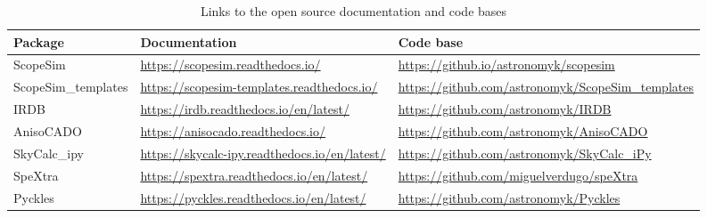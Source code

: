 \begin{table}
\caption{Links to the open source documentation and code bases}
\label{tbl-list-of-packages}
\begin{tabularx}{\linewidth}{|l|X|X|}
\hline

Package
 &
Documentation
 &
Code base
 \\
\hline

ScopeSim
 &
\url{https://scopesim.readthedocs.io/}
 &
\url{https://github.io/astronomyk/scopesim}
 \\
\hline

ScopeSim\_templates
 &
\url{https://scopesim-templates.readthedocs.io/}
 &
\url{https://github.com/astronomyk/ScopeSim_templates}
 \\
\hline

IRDB
 &
\url{https://irdb.readthedocs.io/en/latest/}
 &
\url{https://github.com/astronomyk/IRDB}
 \\
\hline

AnisoCADO
 &
\url{https://anisocado.readthedocs.io/}
 &
\url{https://github.com/astronomyk/AnisoCADO}
 \\
\hline

SkyCalc\_ipy
 &
\url{https://skycalc-ipy.readthedocs.io/en/latest/}
 &
\url{https://github.com/astronomyk/SkyCalc_iPy}
 \\
\hline

SpeXtra
 &
\url{https://spextra.readthedocs.io/en/latest/}
 &
\url{https://github.com/miguelverdugo/speXtra}
 \\
\hline

Pyckles
 &
\url{https://pyckles.readthedocs.io/en/latest/}
 &
\url{https://github.com/astronomyk/Pyckles}
 \\
\hline
\end{tabularx}
\end{table}
